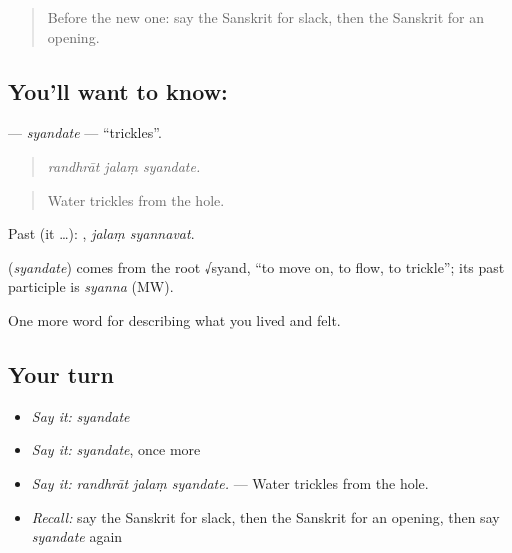 \label{lesson:SA-C509-syandate}



\begin{quote}
Before the new one: say the Sanskrit for slack, then the Sanskrit for an opening.
\end{quote}

\subsection*{You'll want to know: }
\textbf{} — \emph{syandate} — \textquotedblleft{}trickles\textquotedblright{}.

\begin{quote}
  
\end{quote}

\begin{quote}
\emph{randhrāt jalaṃ syandate.}
\end{quote}

\begin{quote}
Water trickles from the hole.
\end{quote}

Past (it …):  , \emph{jalaṃ syannavat}.

\begin{cousinweb}
\textbf{} (\emph{syandate}) comes from the root √syand, \textquotedblleft{}to move on, to flow, to trickle\textquotedblright{}; its past participle is \emph{syanna} (MW).
\end{cousinweb}

\begin{grammarlens}[title={What you've built}]
One more word for describing what you lived and felt.
\end{grammarlens}

\subsection*{Your turn}
\begin{itemize}
\raggedright
  \item \emph{Say it:} \emph{syandate}
  \item \emph{Say it:} \emph{syandate}, once more
  \item \emph{Say it:} \emph{randhrāt jalaṃ syandate.} — Water trickles from the hole.
  \item \emph{Recall:} say the Sanskrit for slack, then the Sanskrit for an opening, then say \emph{syandate} again
\end{itemize}


